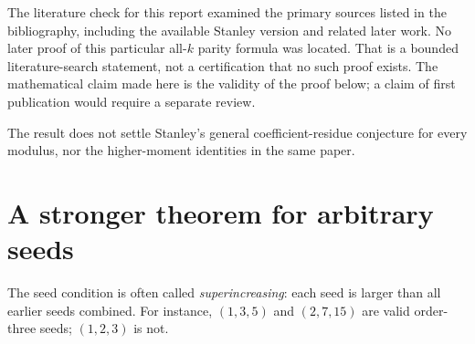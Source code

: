\documentclass[11pt]{article}
\numberwithin{equation}{section}
\theoremstyle{definition}
\newtheorem{definition}[theorem]{Definition}
\theoremstyle{remark}
\newcommand{\Z}{\mathbb Z}
\newcommand{\eps}{\varepsilon}
\begin{document}
The literature check for this report examined the primary sources listed in
the bibliography, including the available Stanley version and related later
work. No later proof of this particular all-$k$ parity formula was located.
That is a bounded literature-search statement, not a certification that no
such proof exists. The mathematical claim made here is the validity of the
proof below; a claim of first publication would require a separate review.

The result does not settle Stanley's general coefficient-residue conjecture
for every modulus, nor the higher-moment identities in the same paper.

\section{A stronger theorem for arbitrary seeds}

The seed condition is often called \emph{superincreasing}: each seed is larger
than all earlier seeds combined. For instance, $(1,3,5)$ and $(2,7,15)$ are
valid order-three seeds; $(1,2,3)$ is not.

\end{document}
